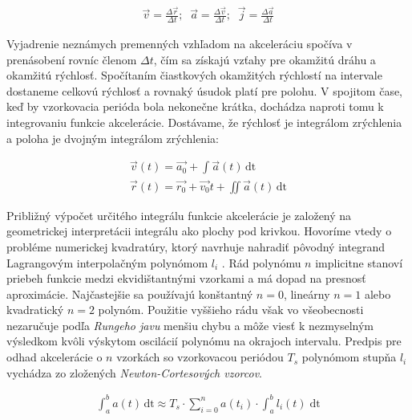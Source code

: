 \begin{ceqn}\begin{align}
   \vec{v} = \frac{\Delta \vec{r}}{\Delta t}; \;\;
   \vec{a} = \frac{\Delta \vec{v}}{\Delta t}; \;\;
   \vec{j} = \frac{\Delta \vec{a}}{\Delta t}
\end{align}\end{ceqn}

Vyjadrenie neznámych premenných vzhľadom na akceleráciu spočíva v prenásobení rovníc členom $\Delta t$, čím sa získajú
vzťahy pre okamžitú dráhu a okamžitú rýchlosť. Spočítaním čiastkových okamžitých rýchlostí na intervale dostaneme celkovú rýchlosť a
rovnaký úsudok platí pre polohu. V spojitom čase, keď by vzorkovacia perióda bola nekonečne krátka, dochádza naproti tomu k
integrovaniu funkcie akcelerácie. Dostávame, že rýchlosť je integrálom zrýchlenia a poloha je dvojným integrálom zrýchlenia:

\begin{ceqn}\begin{align}
   \vec{v}(t) = \vec{a_0} + \int{\vec{a}(t)\,\mathrm{dt}} \\
   \vec{r}(t) = \vec{r_0} + \vec{v_0}t + \iint{\vec{a}(t)\,\mathrm{dt}}
\end{align}\end{ceqn}

Približný výpočet určitého integrálu funkcie akcelerácie je založený na geometrickej interpretácii integrálu ako plochy pod krivkou.
Hovoríme vtedy o probléme numerickej kvadratúry, ktorý navrhuje nahradiť pôvodný integrand Lagrangovým interpolačným polynómom $l_i$
\cite{numerical-mathematics}. Rád polynómu $n$ implicitne stanoví priebeh funkcie medzi ekvidištantnými vzorkami a má dopad na presnosť
aproximácie. Najčastejšie sa používajú konštantný $n = 0$, lineárny $n = 1$ alebo kvadratický $n = 2$ polynóm. Použitie vyššieho rádu
však vo všeobecnosti nezaručuje podľa \emph{Rungeho javu} menšiu chybu a môže viesť k nezmyselným  výsledkom kvôli výskytom oscilácií
polynómu na okrajoch intervalu. Predpis pre odhad akcelerácie o $n$ vzorkách so vzorkovacou periódou $T_s$ polynómom stupňa $l_i$
vychádza zo zložených \emph{Newton-Cortesových vzorcov}.

\begin{ceqn}\begin{align}
   \int_{a}^{b}a(t)\,\mathrm{dt} \approx T_s \cdot \sum_{i=0}^{n}{a(t_i)\cdot \int_a^b{l_i(t) \;\mathrm{dt}}}
\end{align}\end{ceqn}

